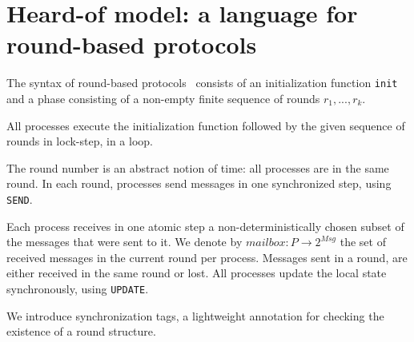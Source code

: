 \section{Heard-of model: a language for round-based protocols}
\label{preliminaries:heardof}

The syntax of round-based protocols \Psync\ consists of an initialization function \texttt{init} and a phase consisting of a non-empty finite sequence of rounds $r_1, ..., r_k$. 

All processes execute the initialization function followed by the given sequence of rounds in lock-step, in a loop. 

The round number is an abstract notion of time: all processes are in the same round. In each round, processes send messages in one synchronized step, using \texttt{SEND}. 

Each process receives in one atomic step a non-deterministically chosen subset of the messages that were sent to it. We denote by $\mathit{mailbox} : P \rightarrow 2^{\mathit{Msg}}$ the set of received messages in the current round per process.
Messages sent in a round, are either received in the same round or lost. 
All processes update the local state synchronously, using \texttt{UPDATE}.  

We introduce synchronization tags, a lightweight annotation for checking the existence of a round structure.




